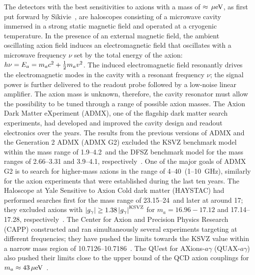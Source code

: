 The detectors with the best sensitivities to axions with a mass of 
$\approx \,\mu\text{e\hspace{-.08em}V}$, as first put forward by 
Sikivie~\cite{SikivieI,SikivieII},  
are haloscopes consisting of a microwave cavity immersed in a strong static 
magnetic field and operated at a cryogenic temperature. 
In the presence of an external magnetic field, the ambient 
oscillating axion field induces an electromagnetic field that oscillates with 
a microwave frequency $\nu$ set by the total energy of the axion: 
$h\nu=E_a=m_a c^2 + \frac{1}{2}m_a v^2$. The induced electromagnetic field  
resonantly drives 
the electromagnetic modes in the cavity with a resonant frequency $\nu$; 
the signal 
power is further delivered %
to the readout probe followed by a low-noise linear amplifier. 
The axion mass is unknown, therefore, 
the cavity resonator must allow the possibility to be tuned through a range
of possible axion masses. The Axion Dark Matter eXperiment (ADMX), 
one of the flagship dark matter search experiments, had developed and 
improved the cavity design and readout electronics over the years. 
The results from the previous 
versions of ADMX and the Generation 2 ADMX (ADMX G2) excluded the KSVZ 
benchmark model within the mass range of %
1.9--4.2\muevcc\ and the DFSZ benchmark model for the mass ranges 
of 2.66--3.31 and 3.9--4.1\muevcc, 
respectively~\cite{ADMXI,ADMXII,ADMXIII,ADMXIV,ADMXV,ADMXVI,ADMXVII}. 
One of the major goals of ADMX G2 is to search for higher-mass axions in the range 
of 4--40\muevcc\ (1--10~GHz), similarly for the axion experiments that 
were established during the last ten years.  
The Haloscope at Yale Sensitive to Axion Cold dark matter 
(HAYSTAC) had performed searches first for the mass range of 
23.15--24\muevcc\ and later at around 17\muevcc; they excluded axions 
with $\left|g_{\gamma}\right|\geq 1.38 \left|g_{\gamma}\right|^\text{KSVZ}$ for $m_a=16.96-17.12$ and 
17.14--17.28\muevcc, respectively~\cite{HAYSTACI}. The Center 
for Axion and Precision Physics Research (CAPP) constructed 
and ran simultaneously several experiments targeting at 
different frequencies; they have pushed the limits towards the 
KSVZ value within a narrow mass region of 
10.7126--10.7186\muevcc~\cite{CAPPI}.
The QUest for AXions-$a\gamma$ (QUAX-$a\gamma$) also pushed their limits 
close to the upper bound of the QCD axion couplings for 
$m_a\approx43\,\mu\text{e\hspace{-.08em}V}$~\cite{QUAX}.   

